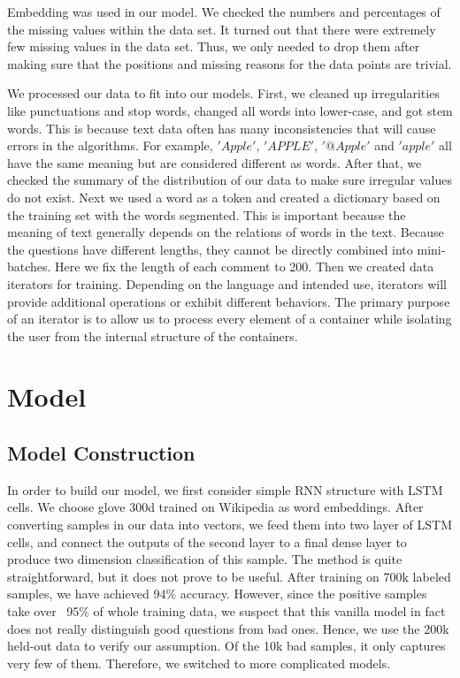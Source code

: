 \documentclass{article}
\begin{document}
Embedding was used in our model. We checked the numbers and percentages of the missing values within the data set. It turned out that there were extremely few missing values in the data set. Thus, we only needed to drop them after making sure that the positions and missing reasons for the data points are trivial. 

We processed our data to fit into our models. First, we cleaned up irregularities like punctuations and stop words, changed all words into lower-case, and got stem words. This is because text data often has many inconsistencies that will cause errors in the algorithms. For example, $'Apple'$, $'APPLE'$, $'@Apple'$ and $'apple'$ all have the same meaning but are considered different as words. After that, we checked the summary of the distribution of our data to make sure irregular values do not exist. Next we used a word as a token and created a dictionary based on the training set with the words segmented. This is important because the meaning of text generally depends on the relations of words in the text. Because the questions have different lengths, they cannot be directly combined into mini-batches. Here we fix the length of each comment to 200. Then we created data iterators for training. Depending on the language and intended use, iterators will provide additional operations or exhibit different behaviors. The primary purpose of an iterator is to allow us to process every element of a container while isolating the user from the internal structure of the containers.

\section{Model}

\subsection{Model Construction}

In order to build our model, we first consider simple RNN structure with LSTM cells. We choose glove 300d trained on Wikipedia as word embeddings. After converting samples in our data into vectors, we feed them into two layer of LSTM cells, and connect the outputs of the second layer to a final dense layer to produce two dimension classification of this sample. The method is quite straightforward, but it does not prove to be useful. After training on 700k labeled samples, we have achieved 94\% accuracy. However, since the positive samples take over ~95\% of whole training data, we suspect that this vanilla model in fact does not really distinguish good questions from bad ones. Hence, we use the 200k held-out data to verify our assumption. Of the 10k bad samples, it only captures very few of them. Therefore, we switched to more complicated models. 
\end{document}
